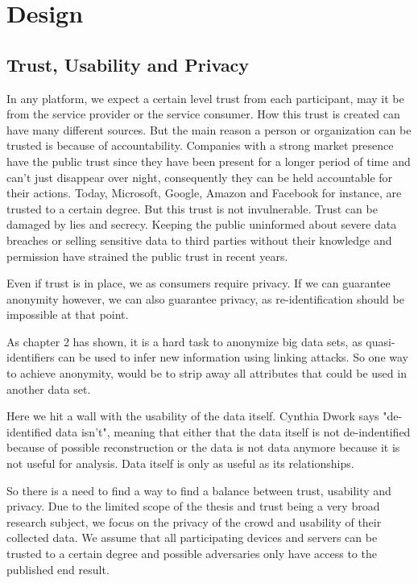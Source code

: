 
\chapter{Design}\label{chapter:design}
\section{Trust, Usability and Privacy}
In any platform, we expect a certain level trust from each participant, may it be from the service provider or the service consumer. How this trust is created can have many different sources. But the main reason a person or organization can be trusted is because of accountability. Companies with a strong market presence have the public trust since they have been present for a longer period of time and can't just disappear over night, consequently they can be held accountable for their actions. Today, Microsoft, Google, Amazon and Facebook for instance, are trusted to a certain degree. But this trust is not invulnerable. Trust can be damaged by lies and secrecy. Keeping the public uninformed about severe data breaches or selling sensitive data to third parties without their knowledge and permission have strained the public trust in recent years.

Even if trust is in place, we as consumers require privacy. If we can guarantee anonymity however, we can also guarantee privacy, as re-identification should be impossible at that point.

As chapter 2 has shown, it is a hard task to anonymize big data sets, as quasi-identifiers can be used to infer new information using linking attacks. So one way to achieve anonymity, would be to strip away all attributes that could be used in another data set.

Here we hit a wall with the usability of the data itself. Cynthia Dwork says "de-identified data isn't",
meaning that either that the data itself is not de-indentified because of possible reconstruction or the data is not data anymore because it is not useful for analysis. Data itself is only as useful as its relationships.

So there is a need to find a way to find a balance between trust, usability and privacy. Due to the limited scope of the thesis and trust being a very broad research subject, we focus on the privacy of the crowd and usability of their collected data. We assume that all participating devices and servers can be trusted to a certain degree and possible adversaries only have access to the published end result.

